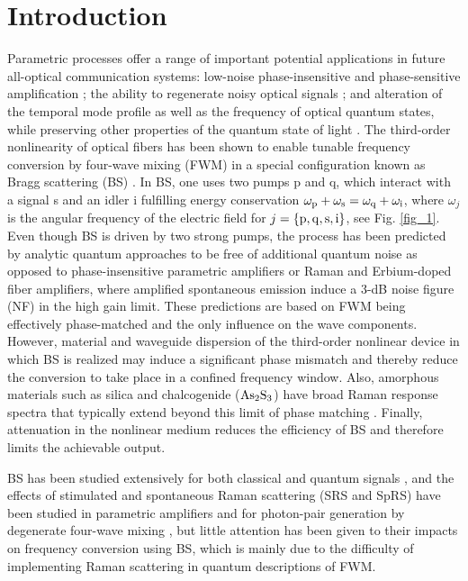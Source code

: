 \documentclass[10pt,letterpaper]{article}
\begin{document}
\section{Introduction}
Parametric processes offer a range of important potential applications in future all-optical communication systems: low-noise phase-insensitive and phase-sensitive amplification \cite{Tong_2010a,Tong_2011a}; the ability to regenerate noisy optical signals \cite{Croussore_2008a,Skold_2008a}; and alteration of the temporal mode profile as well as the frequency of optical quantum states, while preserving other properties of the quantum state of light \cite{Tanzilli,Raymer_2012a}. The third-order nonlinearity of optical fibers has been shown to enable tunable frequency conversion by four-wave mixing (FWM) in a special configuration known as Bragg scattering (BS) \cite{Inoue_1994a}. In BS, one uses two pumps p and q, which interact with a signal s and an idler i fulfilling energy conservation $\omega_{\rm p}+\omega_{\rm s}=\omega_{\rm q}+\omega_{\rm i}$, where $\omega_j$ is the angular frequency of the electric field for $j = \rm \{p,q,s,i\}$, see Fig. \ref{fig_1}. Even though BS is driven by two strong pumps, the process has been predicted by analytic quantum approaches to be free of additional quantum noise \cite{McK_2005a,McK_2005b,Mcguinness_2010a,Mejling_2012a} as opposed to phase-insensitive parametric amplifiers or Raman and Erbium-doped fiber amplifiers, where amplified spontaneous emission induce a 3-dB noise figure (NF) in the high gain limit. These predictions are based on FWM being effectively phase-matched and the only influence on the wave components. However, material and waveguide dispersion of the third-order nonlinear device in which BS is realized may induce a significant phase mismatch and thereby reduce the conversion to take place in a confined frequency window. Also, amorphous materials such as silica and chalcogenide ($\rm As_2S_3$) have broad Raman response spectra that typically extend beyond this limit of phase matching \cite{Clark_2012}. Finally, attenuation in the nonlinear medium reduces the efficiency of BS and therefore limits the achievable output. 

BS has been studied extensively for both classical \cite{Gnauck_2006,Mechin2006} and quantum signals \cite{Mcguinness_2010a,McK_2012a,Clark_2013a}, and the effects of stimulated and spontaneous Raman scattering (SRS and SpRS) have been studied in parametric amplifiers \cite{Tong_2010a,Voss_2004a,Voss_2006a,Friis_2013} and for photon-pair generation by degenerate four-wave mixing \cite{Collins_2012a,Lin_2006}, but little attention has been given to their impacts on frequency conversion using BS, which is mainly due to the difficulty of implementing Raman scattering in quantum descriptions of FWM.
\end{document}
